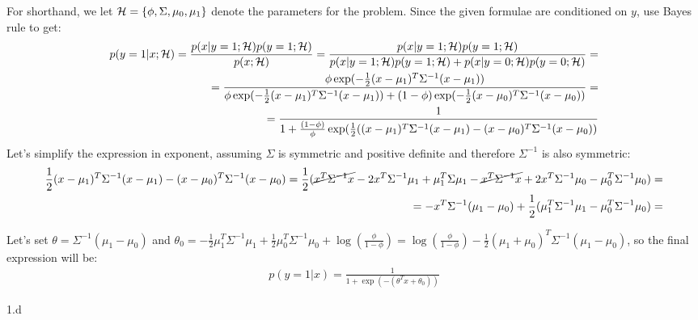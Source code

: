 \begin{answer}
  For shorthand, we let $\mathcal{H} = \{\phi, \Sigma, \mu_{0}, \mu_1\}$ denote the parameters for the problem. Since the given formulae are conditioned on $y$, use Bayes rule to get:
  \begin{align*}
    p(y =1\vert  x ; \mathcal{H}) = \frac {p(x\vert y=1; \mathcal{H}) p(y=1; \mathcal{H})} {p(x; \mathcal{H})}
    = \frac {p(x\vert y=1; \mathcal{H}) p(y=1; \mathcal{H})}
      {p(x\vert y=1; \mathcal{H}) p(y=1; \mathcal{H}) + p(x\vert y={0}; \mathcal{H}) p(y={0}; \mathcal{H})} = \\
      = \frac{\phi \exp(-\frac{1}{2}(x-\mu_1)^T \Sigma^{-1}(x-\mu_1))}{\phi \exp(-\frac{1}{2}(x-\mu_1)^T \Sigma^{-1}(x-\mu_1)) + (1-\phi) \exp(-\frac{1}{2}(x-\mu_0)^T \Sigma^{-1}(x-\mu_0))} = \\ = \frac{1}{1 + \frac{(1-\phi)}{\phi} \exp(\frac{1}{2}((x - \mu_1)^T\Sigma^{-1}(x - \mu_1) - (x - \mu_0)^T \Sigma^{-1}(x-\mu_0))}
  \end{align*}
  Let's simplify the expression in exponent, assuming $\Sigma$ is symmetric and positive definite and therefore $\Sigma^{-1}$ is also symmetric:
  \begin{align*}
  \frac{1}{2}(x-\mu_1)^T \Sigma^{-1}(x-\mu_1) - (x-\mu_0)^T \Sigma^{-1}(x-\mu_0) = \frac{1}{2}(\cancel{x^T \Sigma^{-1}x} - 2x^T \Sigma^{-1}\mu_1 + \mu_1^T \Sigma \mu_1 - \cancel{x^T \Sigma^{-1} x} + 2x^T \Sigma^{-1} \mu_0 - \mu_0^T \Sigma^{-1} \mu_0) = \\ = -x^T \Sigma^{-1} (\mu_1 - \mu_0) + \frac{1}{2}(\mu_1^T \Sigma^{-1} \mu_1 - \mu_0^T \Sigma^{-1} \mu_0) = 
  \end{align*}

  Let's set $\theta = \Sigma^{-1}(\mu_1 - \mu_0)$ and $\theta_0 = -\frac{1}{2}\mu_1^T \Sigma^{-1}\mu_1 + \frac{1}{2} \mu_0^T \Sigma^{-1}\mu_0 + \log (\frac{\phi}{1-\phi}) = \log(\frac{\phi}{1-\phi})-\frac{1}{2}(\mu_1+\mu_0)^T\Sigma^{-1}(\mu_1-\mu_0)$, so the final expression will be:
  \begin{align*}
  p(y=1\vert x) = \frac{1}{1 + \exp (-(\theta^T x + \theta_0))}
  \end{align*}
\end{answer}
\clearpage

\LARGE
1.d
\normalsize


